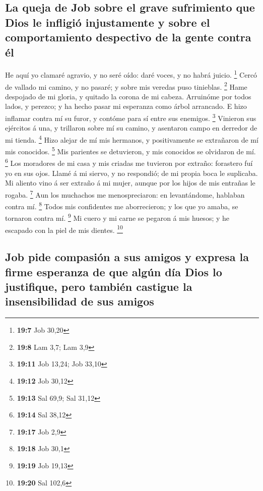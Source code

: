 \hypertarget{la-queja-de-job-sobre-el-grave-sufrimiento-que-dios-le-infligiuxf3-injustamente-y-sobre-el-comportamiento-despectivo-de-la-gente-contra-uxe9l}{%
\subsection{La queja de Job sobre el grave sufrimiento que Dios le
infligió injustamente y sobre el comportamiento despectivo de la gente
contra
él}\label{la-queja-de-job-sobre-el-grave-sufrimiento-que-dios-le-infligiuxf3-injustamente-y-sobre-el-comportamiento-despectivo-de-la-gente-contra-uxe9l}}

 He aquí yo clamaré agravio, y no seré oído: daré voces, y
no habrá juicio. \footnote{\textbf{19:7} Job 30,20}  Cercó
de vallado mi camino, y no pasaré; y sobre mis veredas puso tinieblas.
\footnote{\textbf{19:8} Lam 3,7; Lam 3,9}  Hame despojado
de mi gloria, y quitado la corona de mi cabeza. 
Arruinóme por todos lados, y perezco; y ha hecho pasar mi esperanza como
árbol arrancado.  E hizo inflamar contra mí su furor, y
contóme para sí entre sus enemigos. \footnote{\textbf{19:11} Job 13,24;
  Job 33,10}  Vinieron sus ejércitos á una, y trillaron
sobre mí su camino, y asentaron campo en derredor de mi tienda.
\footnote{\textbf{19:12} Job 30,12}  Hizo alejar de mí
mis hermanos, y positivamente se extrañaron de mí mis conocidos.
\footnote{\textbf{19:13} Sal 69,9; Sal 31,12}  Mis
parientes se detuvieron, y mis conocidos se olvidaron de mí. \footnote{\textbf{19:14}
  Sal 38,12}  Los moradores de mi casa y mis criadas me
tuvieron por extraño: forastero fuí yo en sus ojos. 
Llamé á mi siervo, y no respondió; de mi propia boca le suplicaba.
 Mi aliento vino á ser extraño á mi mujer, aunque por los
hijos de mis entrañas le rogaba. \footnote{\textbf{19:17} Job 2,9}
 Aun los muchachos me menospreciaron: en levantándome,
hablaban contra mí. \footnote{\textbf{19:18} Job 30,1} 
Todos mis confidentes me aborrecieron; y los que yo amaba, se tornaron
contra mí. \footnote{\textbf{19:19} Job 19,13}  Mi cuero
y mi carne se pegaron á mis huesos; y he escapado con la piel de mis
dientes. \footnote{\textbf{19:20} Sal 102,6}

\hypertarget{job-pide-compasiuxf3n-a-sus-amigos-y-expresa-la-firme-esperanza-de-que-alguxfan-duxeda-dios-lo-justifique-pero-tambiuxe9n-castigue-la-insensibilidad-de-sus-amigos}{%
\subsection{Job pide compasión a sus amigos y expresa la firme esperanza
de que algún día Dios lo justifique, pero también castigue la
insensibilidad de sus
amigos}\label{job-pide-compasiuxf3n-a-sus-amigos-y-expresa-la-firme-esperanza-de-que-alguxfan-duxeda-dios-lo-justifique-pero-tambiuxe9n-castigue-la-insensibilidad-de-sus-amigos}}

